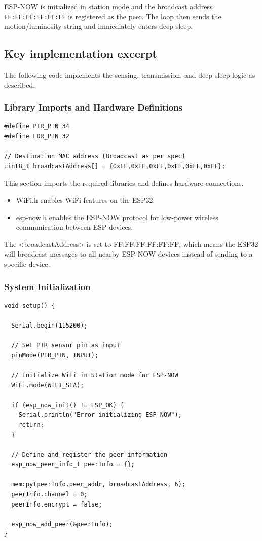 \documentclass[11pt,a4paper]{article}
\begin{document}
ESP-NOW is initialized in station mode and the broadcast address \texttt{FF:FF:FF:FF:FF:FF} is registered as the peer. The loop then sends the motion/luminosity string and immediately enters deep sleep.

\subsection{Key implementation excerpt}
The following code implements the sensing, transmission, and deep sleep logic as described.

\subsubsection*{Library Imports and Hardware Definitions}

\begin{lstlisting}
#define PIR_PIN 34 
#define LDR_PIN 32 

// Destination MAC address (Broadcast as per spec)
uint8_t broadcastAddress[] = {0xFF,0xFF,0xFF,0xFF,0xFF,0xFF};
\end{lstlisting}

This section imports the required libraries and defines hardware connections.

\begin{itemize}
\item WiFi.h enables WiFi features on the ESP32.
\item esp-now.h enables the ESP-NOW protocol for low-power wireless communication between ESP devices.
\end{itemize}

The <broadcastAddress> is set to FF:FF:FF:FF:FF:FF, which means the ESP32 will broadcast messages to all nearby ESP-NOW devices instead of sending to a specific device.

\subsubsection*{System Initialization}

\begin{lstlisting}
void setup() {

  Serial.begin(115200);

  // Set PIR sensor pin as input
  pinMode(PIR_PIN, INPUT);

  // Initialize WiFi in Station mode for ESP-NOW
  WiFi.mode(WIFI_STA);

  if (esp_now_init() != ESP_OK) {
    Serial.println("Error initializing ESP-NOW");
    return;
  }

  // Define and register the peer information
  esp_now_peer_info_t peerInfo = {};

  memcpy(peerInfo.peer_addr, broadcastAddress, 6);
  peerInfo.channel = 0;
  peerInfo.encrypt = false;

  esp_now_add_peer(&peerInfo);
}
\end{lstlisting}
\end{document}
